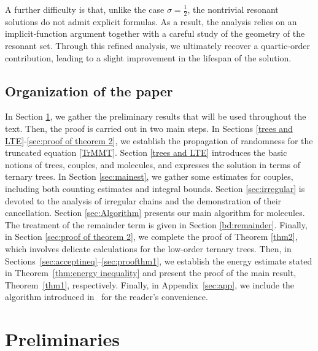 \documentclass[UTF-8,reqno]{amsart}
\numberwithin{equation}{section}
\theoremstyle{definition}
\begin{document}
\begin{enumerate}
A further difficulty is that, unlike the case $\sigma=\frac12$, the nontrivial resonant solutions do not admit explicit formulas. 
As a result, the analysis relies on an implicit-function argument together with a careful study of the geometry of the resonant set. 
Through this refined analysis, we ultimately recover a quartic-order contribution, leading to a slight improvement in the lifespan of the solution. 

 
\end{enumerate}

 
\subsection{Organization of the paper} In Section \ref{sec:pre}, we gather the preliminary results  that will be used throughout the text.
Then, the proof is carried out in two main steps. In Sections \ref{trees and LTE}-\ref{sec:proof of theorem 2}, we establish the propagation of randomness for the truncated equation \eqref{TrMMT}. Section \ref{trees and LTE} introduces the basic notions of trees, couples, and molecules, and expresses the solution in terms of ternary trees. In Section \ref{sec:mainest}, we gather some estimates for couples, including both counting estimates and integral bounds. Section \ref{sec:irregular} is devoted to the analysis of irregular chains and the demonstration of their cancellation. Section \ref{sec:Algorithm} presents our main algorithm for molecules. The treatment of the remainder term is given in Section \ref{bd:remainder}. Finally, in Section \ref{sec:proof of theorem 2}, we complete the proof of Theorem \ref{thm2}, which involves delicate calculations for   the low-order ternary trees. Then, in Sections~\ref{sec:acceptineq}–\ref{sec:proofthm1}, we establish the energy estimate stated in Theorem~\ref{thm:energy inequality} and present the proof of the main result, Theorem~\ref{thm1}, respectively. Finally, in Appendix~\ref{sec:app}, we include the algorithm introduced in~\cite{Vas24} for the reader’s convenience.


 \section{Preliminaries}\label{sec:pre}
\end{document}
